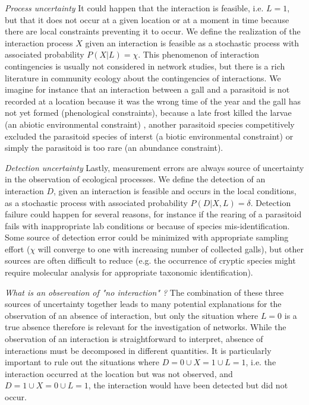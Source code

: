 \documentclass[12pt]{article}
\begin{document}
\textit{Process uncertainty} It could happen that the interaction is feasible, i.e. $L=1$, but that it does not occur at a given location or at a moment in time because there are local constraints preventing it to occur. We define the realization of the interaction process $X$ given an interaction is feasible as a stochastic process with associated probability $P(X|L)=\chi$. This phenomenon of interaction contingencies is usually not considered in network studies, but there is a rich literature in community ecology about the contingencies of interactions. We imagine for instance that an interaction between a gall and a parasitoid is not recorded at a location because it was the wrong time of the year and the gall has not yet formed (phenological constraints), because a late frost killed the larvae (an abiotic environmental constraint) , another parasitoid species competitively excluded the parasitoid species of interst (a biotic environmental constraint) or simply the parasitoid is too rare (an abundance constraint). 

\textit{Detection uncertainty} Lastly, measurement errors are always source of uncertainty in the observation of ecological processes. We define the detection of an interaction $D$, given an interaction is feasible and occurs in the local conditions, as a stochastic process with associated probability $P(D|X,L)=\delta$. Detection failure could happen for several reasons, for instance if the rearing of a parasitoid fails with inappropriate lab conditions or because of species mis-identification. Some source of detection error could be minimized with appropriate sampling effort ($\chi$ will converge to one with increasing number of collected galls), but other sources are often difficult to reduce (e.g. the occurrence of cryptic species might require molecular analysis for appropriate taxonomic identification).

\textit{What is an observation of "no interaction" ?} The combination of these three sources of uncertainty together leads to many potential explanations for the observation of an absence of interaction, but only the situation where $L = 0$ is a true absence therefore is relevant for the investigation of networks. While the observation of an interaction is straightforward to interpret, absence of interactions must be decomposed in different quantities. It is particularly important to rule out the situations where $D=0 \cup X = 1 \cup L=1$, i.e. the interaction occurred at the location but was not observed, and $D=1 \cup X = 0 \cup L =1$, the interaction would have been detected but did not occur. 
\end{document}
